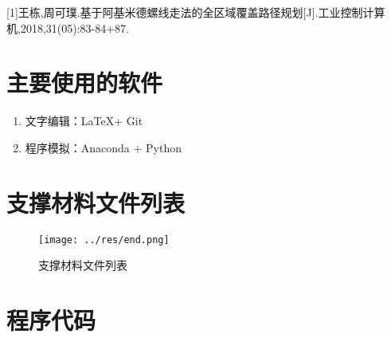 

\nocite{*}

[1]王栋,周可璞.基于阿基米德螺线走法的全区域覆盖路径规划[J].工业控制计算机,2018,31(05):83-84+87.
\clearpage

\appendix


\section{主要使用的软件}

\begin{enumerate}
	\item 文字编辑：\LaTeX + Git
	\item 程序模拟：Anaconda + Python
\end{enumerate}


\section{支撑材料文件列表}

\begin{figure}[htbp]
	\centering
	\texttt{[image: ../res/end.png]}
	\caption{支撑材料文件列表}
	\label{fig:支撑材料文件列表}
\end{figure}


\section{程序代码}


%
%
%


